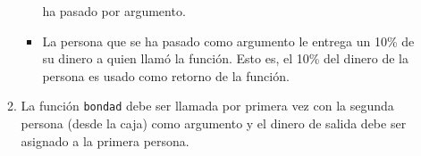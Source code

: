 \documentclass[a4paper,10pt]{article}
\begin{document}
\begin{enumerate}
\begin{enumerate}
\begin{itemize}
	    ha pasado por argumento.
      \item La persona que se ha pasado como argumento le entrega un 10\% de su dinero a quien llamó la función. Esto es, el 10\% del dinero
	    de la persona es usado como retorno de la función.
    \end{itemize}
    \item La función \texttt{bondad} debe ser llamada por primera vez con la segunda persona (desde la caja) como argumento y el dinero de salida debe ser asignado
	  a la primera persona.

  \end{enumerate}




\end{enumerate}
\end{document}
